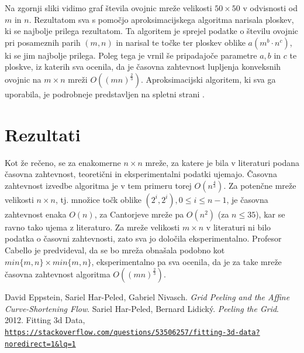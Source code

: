 \documentclass[a4paper]{article}
\begin{document}
Na zgornji sliki vidimo graf števila ovojnic mreže velikosti $50 \times 50$ v odvisnosti od $m$ in $n$. Rezultatom sva s pomočjo aproksimacijskega algoritma narisala ploskev, ki se najbolje
prilega rezultatom. Ta algoritem je sprejel podatke o številu ovojnic pri posameznih parih $(m, n)$ in narisal te točke ter ploskev oblike $a(m^b \cdot n^c)$, ki se jim najbolje prilega.
Poleg tega je vrnil še pripadajoče parametre $a, b$ in $c$ te ploskve, iz katerih sva ocenila, da je časovna zahtevnost lupljenja konveksnih ovojnic na $m \times n$ mreži 
$O((mn)^{\frac{2}{3}})$. Aproksimacijski algoritem, ki sva ga uporabila, je podrobneje predstavljen na spletni strani \cite{aproksimacija}.

\section{Rezultati}
Kot že rečeno, se za enakomerne $n \times n$ mreže, za katere je bila v literaturi podana časovna zahtevnost, teoretični in eksperimentalni podatki ujemajo. Časovna zahtevnost izvedbe algoritma
je v tem primeru torej $O(n ^ \frac{4}{3})$. Za potenčne mreže velikosti $n \times n$, tj. množice točk oblike $(2^i, 2^i), 0 \leq i \leq n - 1$, je časovna zahtevnost enaka
$O(n)$, za Cantorjeve mreže pa $O(n^2)$ (za $n \leq 35$), kar se ravno tako ujema z literaturo.
Za mreže velikosti $m \times n$ v literaturi ni bilo podatka o časovni zahtevnosti, zato sva jo določila eksperimentalno. Profesor Cabello je predvideval,
da se bo mreža obnašala podobno kot $min\{m,n\}\times min\{m,n\}$, eksperimentalno
pa sva ocenila, da je za take mreže časovna zahtevnost algoritma $O((mn)^{\frac{2}{3}})$. 

\begin{thebibliography}{3}
    David Eppstein, Sariel Har-Peled, Gabriel Nivasch. \textit{Grid Peeling and the Affine Curve-Shortening Flow}.
    Sariel Har-Peled, Bernard Lidický. \textit{Peeling the Grid}. 2012.
    Fitting 3d Data, \\\href{https://stackoverflow.com/questions/53506257/fitting-3d-data?noredirect=1&lq=1}
    {\texttt{https://stackoverflow.com/questions/53506257/fitting-3d-data?noredirect=1\&lq=1}}
\end{thebibliography}
\end{document}
